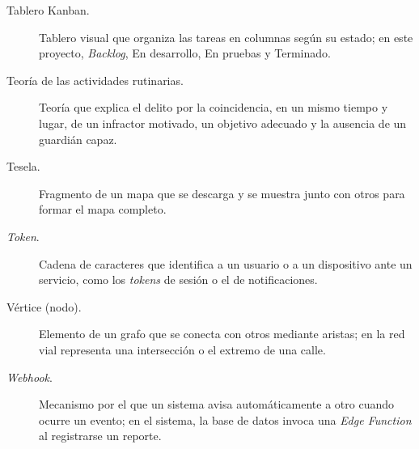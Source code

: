 \begin{description}
    \item[Tablero Kanban.] Tablero visual que organiza las tareas en columnas según su estado; en este proyecto, \textit{Backlog}, En desarrollo, En pruebas y Terminado.

    \item[Teoría de las actividades rutinarias.] Teoría que explica el delito por la coincidencia, en un mismo tiempo y lugar, de un infractor motivado, un objetivo adecuado y la ausencia de un guardián capaz.

    \item[Tesela.] Fragmento de un mapa que se descarga y se muestra junto con otros para formar el mapa completo.

    \item[\textit{Token}.] Cadena de caracteres que identifica a un usuario o a un dispositivo ante un servicio, como los \textit{tokens} de sesión o el de notificaciones.

    \item[Vértice (nodo).] Elemento de un grafo que se conecta con otros mediante aristas; en la red vial representa una intersección o el extremo de una calle.

    \item[\textit{Webhook}.] Mecanismo por el que un sistema avisa automáticamente a otro cuando ocurre un evento; en el sistema, la base de datos invoca una \textit{Edge Function} al registrarse un reporte.
\end{description}
